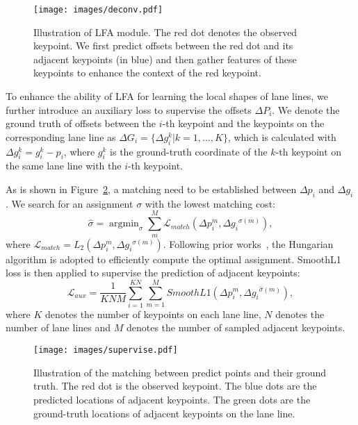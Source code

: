 \documentclass[10pt,twocolumn,letterpaper]{article}
\begin{document}
\begin{figure}[!t]
    \centering
    \texttt{[image: images/deconv.pdf]}
    \caption{Illustration of LFA module. The red dot denotes the observed keypoint. We first predict offsets between the red dot and its adjacent keypoints (in blue) and then gather features of these keypoints to enhance the context of the red keypoint.}
    \label{fig:dconv}
\end{figure}

To enhance the ability of LFA for learning the local shapes of lane lines, we further introduce an auxiliary loss to supervise the offsets $\Delta{P_i}$.
We denote the ground truth of offsets between the $i$-th keypoint and the keypoints on the corresponding lane line as $\Delta{G_i}=\{\Delta{g_i^k}|k=1,...,K\}$, which is calculated with $\Delta{g_i^k}={g_i^k-p_i}$, where $g_i^k$ is the ground-truth coordinate of the $k$-th keypoint on the same lane line with the $i$-th keypoint.

As is shown in Figure~\ref{fig:match}, a matching need to be established between $\Delta{p_i}$ and $\Delta{g_i}$. We search for an assignment $\sigma$ with the lowest matching cost:
\begin{equation}
    \hat{\sigma}=\mathop{\arg\min}_{\sigma}{\sum_m^{M}\mathcal{L}_{match}(\Delta{p_i^m}, \Delta{{g_i}}^{\sigma(m)})},
\end{equation}
where $\mathcal{L}_{match}=L_2(\Delta{p_i^m}, \Delta{{g_i}}^{\sigma(m)})$.
Following prior works~\cite{stewart2016end,carion2020end}, the Hungarian algorithm is adopted to efficiently compute the optimal assignment. SmoothL1 loss is then applied to supervise the prediction of adjacent keypoints:
\begin{equation}
    \mathcal{L}_{aux}=\frac{1}{KNM}\sum_{i=1}^{KN}\sum_{m=1}^M{SmoothL1(\Delta{p_i^m}, \Delta{{g_i}}^{\hat{\sigma}(m)})},
\end{equation}
where $K$ denotes the number of keypoints on each lane line, $N$ denotes the number of lane lines and $M$ denotes the number of sampled adjacent keypoints.
\begin{figure}[!t]
    \centering
    \texttt{[image: images/supervise.pdf]}
    \caption{Illustration of the matching between predict points and their ground truth. The red dot is the observed keypoint. The blue dots are the predicted locations of adjacent keypoints. The green dots are the ground-truth locations of adjacent keypoints on the lane line.}
    \label{fig:match}
\end{figure}
\end{document}
